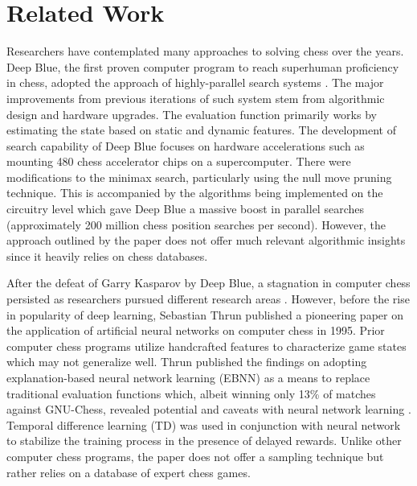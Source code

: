 \documentclass[letterpaper]{article} %
\begin{document}
\newpage
\section{Related Work} 

Researchers have contemplated many approaches to solving chess over the years. Deep Blue, the first proven computer program to reach superhuman proficiency in chess, adopted the approach of highly-parallel search systems \cite{DeepBlue}. The major improvements from previous iterations of such system stem from algorithmic design and hardware upgrades. The evaluation function primarily works by estimating the state based on static and dynamic features. The development of search capability of Deep Blue focuses on hardware accelerations such as mounting 480 chess accelerator chips on a supercomputer. There were modifications to the minimax search, particularly using the null move pruning technique. This is accompanied by the algorithms being implemented on the circuitry level which gave Deep Blue a massive boost in parallel searches (approximately 200 million chess position searches per second). However, the approach outlined by the paper does not offer much relevant algorithmic insights since it heavily relies on chess databases.

After the defeat of Garry Kasparov by Deep Blue, a stagnation in computer chess persisted as researchers pursued different research areas \cite{deepblueshistory}. However, before the rise in popularity of deep learning, Sebastian Thrun published a pioneering paper on the application of artificial neural networks on computer chess in 1995. Prior computer chess programs utilize handcrafted features to characterize game states which may not generalize well. Thrun published the findings on adopting explanation-based neural network learning (EBNN) as a means to replace traditional evaluation functions which, albeit winning only 13\% of matches against GNU-Chess, revealed potential and caveats with neural network learning \cite{thrun}. Temporal difference learning (TD) was used in conjunction with neural network to stabilize the training process in the presence of delayed rewards. Unlike other computer chess programs, the paper does not offer a sampling technique but rather relies on a database of expert chess games.
\end{document}
